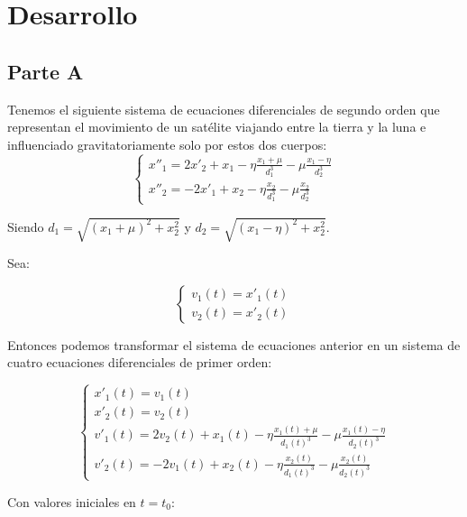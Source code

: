 \documentclass[titlepage,a4paper]{article}
\begin{document}
\section{Desarrollo}\label{sec:desarrollo}
	\subsection{Parte A}\label{sec:parteA}

		Tenemos el siguiente sistema de ecuaciones diferenciales de segundo orden que representan el movimiento de un satélite
		viajando entre la tierra y la luna e influenciado gravitatoriamente solo por estos dos cuerpos:
		\begin{equation}
			\begin{cases}
				x''_{1} = 2x'_{2} + x_{1} - \eta\frac{x_{1} + \mu}{d_{1}^{3}} - \mu\frac{x_{1}-\eta}{d_{2}^{3}}\\
				x''_{2} = -2x'_{1} + x_{2} - \eta\frac{x_{2}}{d_{1}^{3}} - \mu\frac{x_{2}}{d_{2}^{3}}
			\end{cases}
		\end{equation}

		Siendo $d_{1}=\sqrt{(x_{1}+\mu)^{2} + x_{2}^{2}}$ y $d_{2}=\sqrt{(x_{1}-\eta)^{2} + x_{2}^{2}}$.

		Sea:

		\begin{equation}
			\begin{cases}
				v_{1}(t) = x'_{1}(t)\\
				v_{2}(t) = x'_{2}(t)
			\end{cases}
		\end{equation}

		Entonces podemos transformar el sistema de ecuaciones anterior en un sistema de cuatro ecuaciones 
		diferenciales de primer orden:

		\begin{equation}
			\begin{cases}
				x'_{1}(t) = v_{1}(t)\\
				x'_{2}(t) = v_{2}(t)\\
				v'_{1}(t) = 2v_{2}(t) + x_{1}(t) - \eta\frac{x_{1}(t) + \mu}{d_{1}(t)^{3}} - \mu\frac{x_{1}(t) - \eta}{d_{2}(t)^{3}}\\
				v'_{2}(t) = -2v_{1}(t) + x_{2}(t) - \eta\frac{x_{2}(t)}{d_{1}(t)^{3}} - \mu\frac{x_{2}(t)}{d_{2}(t)^{3}}
			\end{cases}
		\end{equation}

		Con valores iniciales en $t=t_{0}$:
\end{document}
